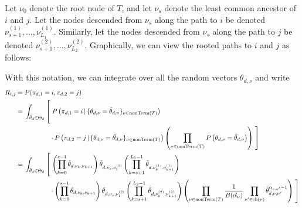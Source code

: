 \documentclass{article}
\theoremstyle{definition}
\newcommand{\nonTerm}{\text{nonTerm}}
\newcommand{\tallbracketl}[2]{\left #1 \rule{0ex}{#2} \right.}
\newcommand{\tallbracketr}[2]{\left. \rule{0ex}{#2} \right #1}
\begin{document}
Let $\nu_0$ denote the root node of $T$, and let $\nu_s$ denote the least common ancestor of $i$ and $j$.
Let the nodes descended from $\nu_s$ along the path to $i$ be denoted $\nu^{(1)}_{s+1}, \ldots, \nu^{(1)}_{L_1}$.
Similarly, let the nodes descended from $\nu_s$ along the path to $j$ be denoted $\nu^{(2)}_{s+1}, \ldots, \nu^{(2)}_{L_2}$.
Graphically, we can view the rooted paths to $i$ and $j$ as follows:
\begin{center}
\end{center}

With this notation, we can integrate over all the random vectors $\theta_{d,\nu}$ and write
{
\newcommand{\prefix}{\int_{\tilde \theta_d \in \Theta_d} \tallbracketl{[}{5ex}}
\begin{align*}
R_{i,j}
={}&P(\pi_{d,1} = i, \pi_{d,2} = j)
\\
={}&
\prefix
  P\left(\pi_{d,1}=i \,|\, \{ \theta_{d,\nu} = \tilde \theta_{d,\nu} \}_{\nu \in \nonTerm(T)}\right)
\\ &\phantom{\prefix}
  \cdot P\left(\pi_{d,2}=j \,|\, \{ \theta_{d,\nu} = \tilde \theta_{d,\nu} \}_{\nu \in \nonTerm(T)}\right)
  \left(
    \prod_{\nu \in \nonTerm(T)} P\left(\theta_{d,\nu} = \tilde \theta_{d,\nu}\right)
  \right)
  \tallbracketr{]}{5ex}
\\
={}&
\prefix
  \left(
    \prod_{k=0}^{s-1} \tilde \theta_{d,\nu_k,\nu_{k+1}}
  \right)
  \tilde \theta_{d,\nu_s,\nu^{(1)}_1}
  \left(
    \prod_{k=s+1}^{L_1-1} \tilde \theta_{d,\nu^{(1)}_{k},\nu^{(1)}_{k+1}}
  \right)
\\ &\phantom{\prefix}
  \cdot
  \left(
    \prod_{k=0}^{s-1} \tilde \theta_{d,\nu_k,\nu_{k+1}}
  \right)
  \tilde \theta_{d,\nu_s,\nu^{(2)}_1}
  \left(
    \prod_{k=s+1}^{L_2-1} \tilde \theta_{d,\nu^{(2)}_{k},\nu^{(2)}_{k+1}}
  \right)
  \left(
    \prod_{\nu \in \nonTerm(T)}
    \frac{1}{B(\vec\alpha_\nu)}
    \prod_{\nu' \in \text{ch}(\nu)}
    \tilde \theta_{d,\nu,\nu'}^{\alpha_{\nu,\nu'}-1}
  \right)
  \tallbracketr{]}{5ex}
\end{align*}
}
\end{document}
